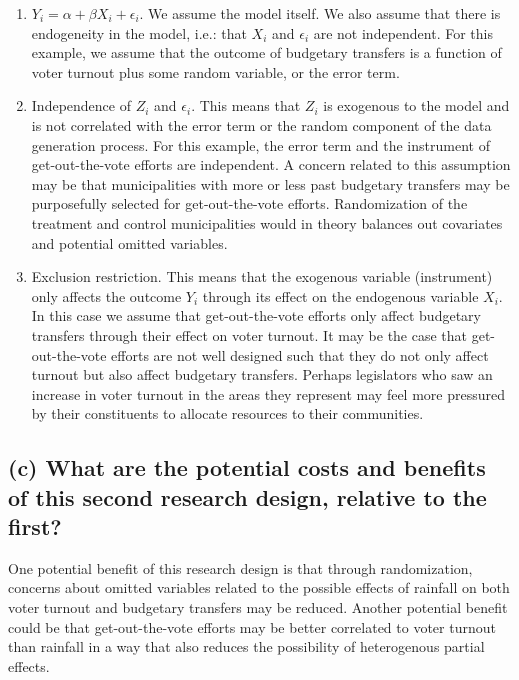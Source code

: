 \documentclass[
]{article}
\begin{document}
\begin{enumerate}
  \item $Y_{i}=\alpha+\beta X_{i}+\epsilon_{i}$. We assume the model itself. We also assume that there is endogeneity in the model, i.e.: that $X_{i}$ and $\epsilon_{i}$ are not independent. For this example, we assume that the outcome of budgetary transfers is a function of voter turnout plus some random variable, or the error term.  
  \item Independence of $Z_{i}$ and $\epsilon_{i}$. This means that $Z_{i}$ is exogenous to the model and is not correlated with the error term or the random component of the data generation process. For this example, the error term and the instrument of get-out-the-vote efforts are independent. A concern related to this assumption may be that municipalities with more or less past budgetary transfers may be purposefully selected for get-out-the-vote efforts. Randomization of the treatment and control municipalities would in theory balances out covariates and potential omitted variables. 
  
  \item Exclusion restriction. This means that the exogenous variable (instrument) only affects the outcome $Y_{i}$ through its effect on the endogenous variable $X_{i}$. In this case we assume that get-out-the-vote efforts only affect budgetary transfers through their effect on voter turnout. It may be the case that get-out-the-vote efforts are not well designed such that they do not only affect turnout but also affect budgetary transfers. Perhaps legislators who saw an increase in voter turnout in the areas they represent may feel more pressured by their constituents to allocate resources to their communities. 
\end{enumerate}

\hypertarget{c-what-are-the-potential-costs-and-benefits-of-this-second-research-design-relative-to-the-first}{%
\subsection{(c) What are the potential costs and benefits of this second
research design, relative to the
first?}\label{c-what-are-the-potential-costs-and-benefits-of-this-second-research-design-relative-to-the-first}}

One potential benefit of this research design is that through
randomization, concerns about omitted variables related to the possible
effects of rainfall on both voter turnout and budgetary transfers may be
reduced. Another potential benefit could be that get-out-the-vote
efforts may be better correlated to voter turnout than rainfall in a way
that also reduces the possibility of heterogenous partial effects.
\end{document}
